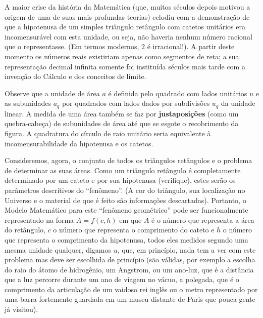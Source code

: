     A maior crise da história da Matemática (que, muitos séculos depois motivou a origem de uma de suas mais profundas teorias) eclodiu com a demonstração de que a hipotenusa de um simples triângulo retângulo com catetos unitários era incomensurável com esta unidade, ou seja, não haveria nenhum número racional que o representasse. (Em termos modernos, \(2\) é irracional!). A partir deste momento os números reais existiriam apenas como segmentos de reta; a sua representação decimal infinita somente foi instituída séculos mais tarde com a invenção do Cálculo e dos conceitos de limite.

    Observe que a unidade de área \(a\) é definida pelo quadrado com lados unitários \(u\) e as subunidades \(a_q\) por quadrados com lados dados por subdivisões \(u_q\) da unidade linear. A medida de uma área também se faz por \textbf{justaposições} (como um quebra-cabeça) de subunidades de área até que se esgote o recobrimento da figura. A quadratura do círculo de raio unitário seria equivalente à incomensurabilidade da hipotenusa e os catetos.

    Consideremos, agora, o conjunto de todos os triângulos retângulos e o problema de determinar as suas áreas. Como um triângulo retângulo é completamente determinado por um cateto e por sua hipotenusa (verifique), estes serão os parâmetros descritivos do ``fenômeno''. (A cor do triângulo, sua localização no Universo e o material de que é feito são informações descartadas). Portanto, o Modelo Matemático para este ``fenômeno geométrico'' pode ser funcionalmente representado na forma \(A = f(c, h)\) em que \(A\) é o número que representa a área do retângulo, \(c\) o número que representa o comprimento do cateto e \(h\) o número que representa o comprimento da hipotenusa, todos eles medidos segundo uma mesma unidade qualquer, digamos \(u\), que, em princípio, nada tem a ver com este problema mas deve ser escolhida de princípio (são válidas, por exemplo a escolha do raio do átomo de hidrogênio, um Angstrom, ou um ano-luz, que é a distância que a luz percorre durante um ano de viagem no vácuo, a polegada, que é o comprimento da articulação de um vaidoso rei inglês ou o metro representado por uma barra fortemente guardada em um museu distante de Paris que pouca gente já visitou).

